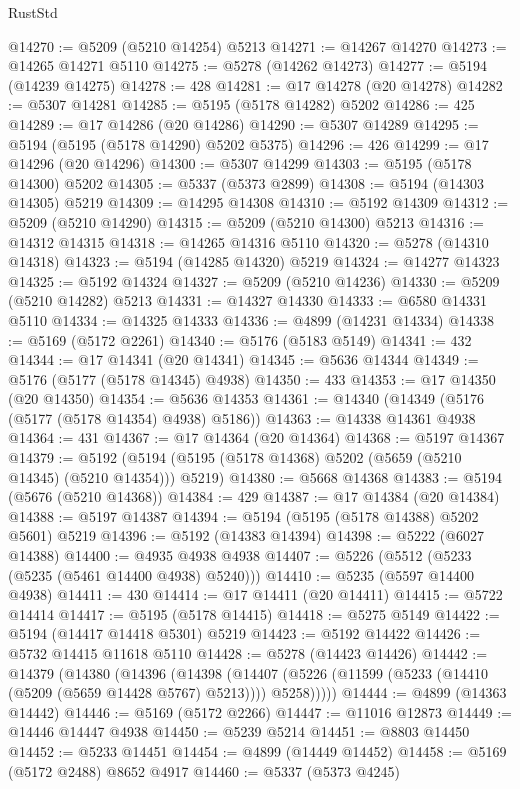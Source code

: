 \begin{lexlean}{RustStd}
\begin{coremodule}
@14270 := @5209 (@5210 @14254) @5213
@14271 := @14267 @14270
@14273 := @14265 @14271 @5110
@14275 := @5278 (@14262 @14273)
@14277 := @5194 (@14239 @14275)
@14278 := 428
@14281 := @17 @14278 (@20 @14278)
@14282 := @5307 @14281
@14285 := @5195 (@5178 @14282) @5202
@14286 := 425
@14289 := @17 @14286 (@20 @14286)
@14290 := @5307 @14289
@14295 := @5194 (@5195 (@5178 @14290) @5202 @5375)
@14296 := 426
@14299 := @17 @14296 (@20 @14296)
@14300 := @5307 @14299
@14303 := @5195 (@5178 @14300) @5202
@14305 := @5337 (@5373 @2899)
@14308 := @5194 (@14303 @14305) @5219
@14309 := @14295 @14308
@14310 := @5192 @14309
@14312 := @5209 (@5210 @14290)
@14315 := @5209 (@5210 @14300) @5213
@14316 := @14312 @14315
@14318 := @14265 @14316 @5110
@14320 := @5278 (@14310 @14318)
@14323 := @5194 (@14285 @14320) @5219
@14324 := @14277 @14323
@14325 := @5192 @14324
@14327 := @5209 (@5210 @14236)
@14330 := @5209 (@5210 @14282) @5213
@14331 := @14327 @14330
@14333 := @6580 @14331 @5110
@14334 := @14325 @14333
@14336 := @4899 (@14231 @14334)
@14338 := @5169 (@5172 @2261)
@14340 := @5176 (@5183 @5149)
@14341 := 432
@14344 := @17 @14341 (@20 @14341)
@14345 := @5636 @14344
@14349 := @5176 (@5177 (@5178 @14345) @4938)
@14350 := 433
@14353 := @17 @14350 (@20 @14350)
@14354 := @5636 @14353
@14361 := @14340 (@14349 (@5176 (@5177 (@5178 @14354) @4938) @5186))
@14363 := @14338 @14361 @4938
@14364 := 431
@14367 := @17 @14364 (@20 @14364)
@14368 := @5197 @14367
@14379 := @5192 (@5194 (@5195 (@5178 @14368) @5202 (@5659 (@5210 @14345) (@5210 @14354))) @5219)
@14380 := @5668 @14368
@14383 := @5194 (@5676 (@5210 @14368))
@14384 := 429
@14387 := @17 @14384 (@20 @14384)
@14388 := @5197 @14387
@14394 := @5194 (@5195 (@5178 @14388) @5202 @5601) @5219
@14396 := @5192 (@14383 @14394)
@14398 := @5222 (@6027 @14388)
@14400 := @4935 @4938 @4938
@14407 := @5226 (@5512 (@5233 (@5235 (@5461 @14400 @4938) @5240)))
@14410 := @5235 (@5597 @14400 @4938)
@14411 := 430
@14414 := @17 @14411 (@20 @14411)
@14415 := @5722 @14414
@14417 := @5195 (@5178 @14415)
@14418 := @5275 @5149
@14422 := @5194 (@14417 @14418 @5301) @5219
@14423 := @5192 @14422
@14426 := @5732 @14415 @11618 @5110
@14428 := @5278 (@14423 @14426)
@14442 := @14379
    (@14380
      (@14396
        (@14398
          (@14407 (@5226 (@11599 (@5233 (@14410 (@5209 (@5659 @14428 @5767) @5213)))) @5258)))))
@14444 := @4899 (@14363 @14442)
@14446 := @5169 (@5172 @2266)
@14447 := @11016 @12873
@14449 := @14446 @14447 @4938
@14450 := @5239 @5214
@14451 := @8803 @14450
@14452 := @5233 @14451
@14454 := @4899 (@14449 @14452)
@14458 := @5169 (@5172 @2488) @8652 @4917
@14460 := @5337 (@5373 @4245)

\end{coremodule}
\end{lexlean}
